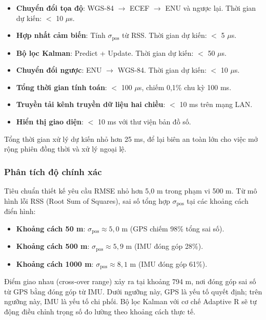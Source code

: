 \begin{itemize}
    \item \textbf{Chuyển đổi tọa độ}: WGS-84 $\rightarrow$ ECEF $\rightarrow$ ENU và ngược lại. Thời gian dự kiến: $<$ 10 $\mu$s.
    \item \textbf{Hợp nhất cảm biến}: Tính $\sigma_{\text{pos}}$ từ RSS. Thời gian dự kiến: $<$ 5 $\mu$s.
    \item \textbf{Bộ lọc Kalman}: Predict + Update. Thời gian dự kiến: $<$ 50 $\mu$s.
    \item \textbf{Chuyển đổi ngược}: ENU $\rightarrow$ WGS-84. Thời gian dự kiến: $<$ 10 $\mu$s.
    \item \textbf{Tổng thời gian tính toán}: $<$ 100 $\mu$s, chiếm 0,1\% chu kỳ 100 ms.
    \item \textbf{Truyền tải kênh truyền dữ liệu hai chiều}: $<$ 10 ms trên mạng LAN.
    \item \textbf{Hiển thị giao diện}: $<$ 10 ms với thư viện bản đồ số.
\end{itemize}

Tổng thời gian xử lý dự kiến nhỏ hơn 25 ms, để lại biên an toàn lớn cho việc mở rộng phiên đồng thời và xử lý ngoại lệ.

\subsubsection{Phân tích độ chính xác}

\hspace{0.5cm} Tiêu chuẩn thiết kế yêu cầu RMSE nhỏ hơn 5,0 m trong phạm vi 500 m. Từ mô hình lỗi RSS (Root Sum of Squares), sai số tổng hợp $\sigma_{\text{pos}}$ tại các khoảng cách điển hình:

\begin{itemize}
    \item \textbf{Khoảng cách 50 m}: $\sigma_{\text{pos}} \approx 5{,}0$ m (GPS chiếm 98\% tổng sai số).
    \item \textbf{Khoảng cách 500 m}: $\sigma_{\text{pos}} \approx 5{,}9$ m (IMU đóng góp 28\%).
    \item \textbf{Khoảng cách 1000 m}: $\sigma_{\text{pos}} \approx 8{,}1$ m (IMU đóng góp 61\%).
\end{itemize}

Điểm giao nhau (cross-over range) xảy ra tại khoảng 794 m, nơi đóng góp sai số từ GPS bằng đóng góp từ IMU. Dưới ngưỡng này, GPS là yếu tố quyết định; trên ngưỡng này, IMU là yếu tố chi phối. Bộ lọc Kalman với cơ chế Adaptive R sẽ tự động điều chỉnh trọng số đo lường theo khoảng cách thực tế.

